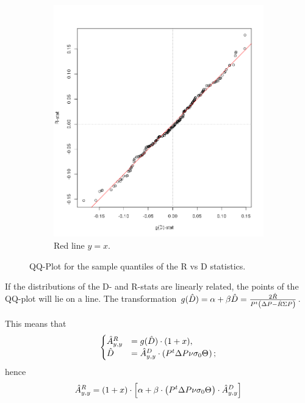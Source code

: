 \documentclass{article}
\newcommand{\err}{\epsilon}
\begin{document}
\begin{figure}[h]
\begin{subfigure}{.5\textwidth}
\includegraphics[scale=.5]{R_gD_QQPlot}
\caption{Red line $y = x$.}
\end{subfigure}
\caption{QQ-Plot for the sample quantiles of the R vs D statistics.}
\end{figure}

If the distributions of the D- and R-stats are linearly related, the points of the QQ-plot will lie on a line. The transformation $g(\D*) = \alpha + \beta\D* = \frac{2\R*}{P^t\bkt{\DP - \R*\SP}}$.

This means that
\begin{equation*}
\begin{cases}
	\Ayy*[R] &= g(\D*)\cdot(1+x), \\
	\D* 	 &= \Ayy*[D]\cdot\bkt{P^t\DP\nu\CS[0]\Thick};
\end{cases}
\end{equation*}
hence
\[
	\Ayy*[R] = (1+x) \cdot \bkt*{\alpha + \beta\cdot\bkt{P^t\DP\nu\CS[0]\Thick}\cdot\Ayy*[D]}
\]

%
%
\end{document}
